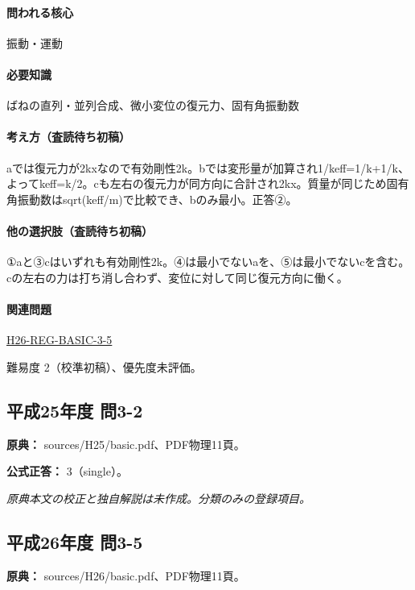 \paragraph{問われる核心} 振動・運動

\paragraph{必要知識} ばねの直列・並列合成、微小変位の復元力、固有角振動数

\paragraph{考え方（査読待ち初稿）} aでは復元力が2kxなので有効剛性2k。bでは変形量が加算され1/keff=1/k+1/k、よってkeff=k/2。cも左右の復元力が同方向に合計され2kx。質量が同じため固有角振動数はsqrt(keff/m)で比較でき、bのみ最小。正答②。

\paragraph{他の選択肢（査読待ち初稿）} ①aと③cはいずれも有効剛性2k。④は最小でないaを、⑤は最小でないcを含む。cの左右の力は打ち消し合わず、変位に対して同じ復元方向に働く。

\paragraph{関連問題} \hyperref[q:h26-reg-basic-3-5]{H26-REG-BASIC-3-5}

\par 難易度 2（校準初稿）、優先度未評価。

\subsection{平成25年度 問3-2}
\label{q:h25-reg-basic-3-2}

\noindent\textbf{原典：} sources/H25/basic.pdf、PDF物理11頁。

\textbf{公式正答：} 3（single）。

\par\textit{原典本文の校正と独自解説は未作成。分類のみの登録項目。}

\subsection{平成26年度 問3-5}
\label{q:h26-reg-basic-3-5}

\noindent\textbf{原典：} sources/H26/basic.pdf、PDF物理11頁。

